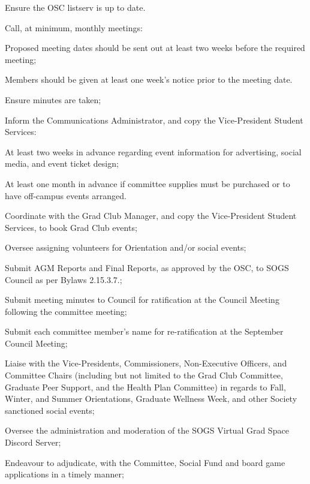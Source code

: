 \begin{longenum}[ label*=\thesubsection.\arabic*., align=left]
\begin{longenum}[label*=\arabic*., align=left]
\begin{longenum}[label*=\arabic*., align=left]
\begin{longenum}[label*=\arabic*., align=left]
				\item Ensure the OSC listserv is up to date.												
				\end{longenum}				
			\item Call, at minimum, monthly meetings:
				\begin{longenum}[label*=\arabic*., align=left]
				\item Proposed meeting dates should be sent out at least two weeks before the required meeting;
				\item Members should be given at least one week's notice prior to the meeting date.
				\end{longenum}	
			\item Ensure minutes are taken;
			\item Inform the Communications Administrator, and copy the Vice-President Student Services:
				\begin{longenum}[label*=\arabic*., align=left]
				\item At least two weeks in advance regarding event information for advertising, social media, and event ticket design;
				\item At least one month in advance if committee supplies must be purchased or to have off-campus events arranged.
				\end{longenum}	
			\item Coordinate with the Grad Club Manager, and copy the Vice-President Student Services, to book Grad Club events;
			\item Oversee assigning volunteers for Orientation and/or social events;
			\item Submit AGM Reports and Final Reports, as approved by the OSC, to SOGS Council as per Bylaws 2.15.3.7.;
			\item Submit meeting minutes to Council for ratification at the Council Meeting following the committee meeting;
			\item Submit each committee member's name for re-ratification at the September Council Meeting;							
			\item Liaise with the Vice-Presidents, Commissioners, Non-Executive Officers, and Committee Chairs (including but not limited to the Grad Club Committee, Graduate Peer Support, and the Health Plan Committee) in regards to Fall, Winter, and Summer Orientations, Graduate Wellness Week, and other Society sanctioned social events;			
			\item Oversee the administration and moderation of the SOGS Virtual Grad Space Discord Server;			
			\item Endeavour to adjudicate, with the Committee, Social Fund and board game applications in a timely manner;			

\end{longenum}
\end{longenum}
\end{longenum}
